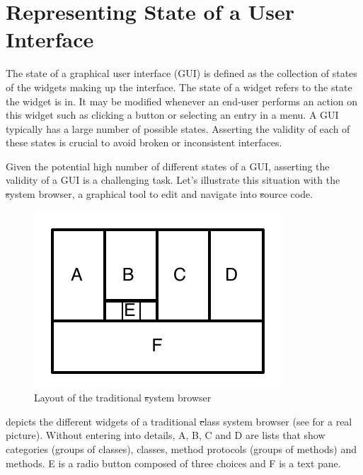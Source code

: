 \documentclass[a4paper,10pt,twoside]{book}
\begin{document}
\section{Representing State of a User Interface} \label{sec:problem}

The state of a graphical user interface (GUI) is defined as the collection of states of the widgets making up the interface. The state of a widget refers to the state the widget is in. It may be modified whenever an end-user performs an action on this widget such as clicking a button or selecting an entry in a menu. A GUI typically has a large number of possible states. Asserting the validity  of each of these states is crucial to avoid broken or inconsistent interfaces.

Given the potential high number of different states of a GUI, asserting the validity of a GUI is a challenging task.  Let's illustrate this situation with the \st system browser, a graphical tool to edit and navigate into \st source code.

\begin{figure}[!ht]
\begin{center}
\includegraphics[scale=0.65]{miniStBrowser}
\caption{Layout of the traditional \st system browser} 
\end{center}
\end{figure}


 depicts the different widgets of a traditional \st class system browser (see  for a real picture). Without entering into details, A, B, C and D are lists that show categories (groups of classes), classes, method protocols (groups of methods) and methods. E is a radio button composed of three choices and F is a text pane. 
\end{document}
